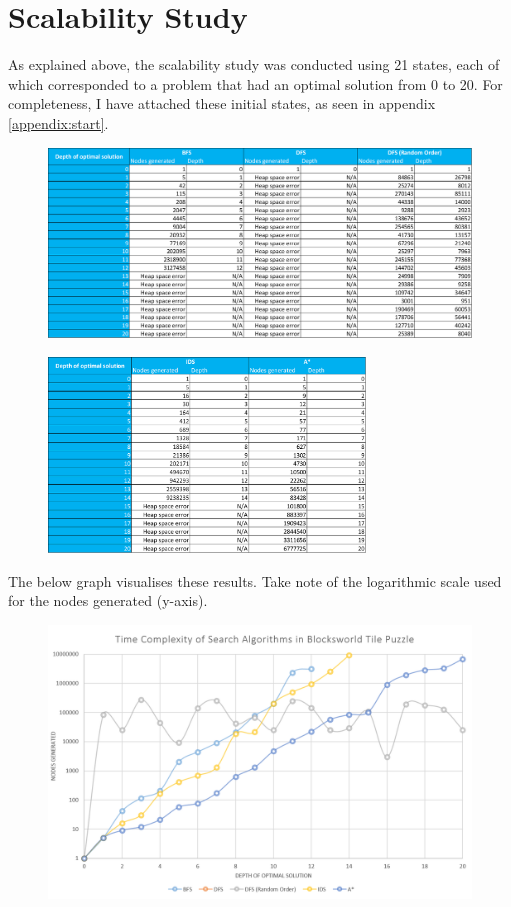\documentclass{article}
\begin{document}
	\newpage
	\section{Scalability Study}
	As explained above, the scalability study was conducted using 21 states, each of which corresponded to a problem that had an optimal solution from 0 to 20. For completeness, I have attached these initial states, as seen in appendix \ref{appendix:start}.
	\begin{figure}[h]	
		\centering
		\includegraphics[width=\textwidth,keepaspectratio]{Results-1.png}
	\end{figure}
	\begin{figure}[h]	
		\centering
		\includegraphics[width=0.75\textwidth,keepaspectratio]{Results-2.png}
	\end{figure}

	\newpage
	The below graph visualises these results. Take note of the logarithmic scale used for the nodes generated (y-axis).
	\begin{figure}[h]	
		\centering
		\includegraphics[height=0.5\textheight,keepaspectratio]{Results-Plot.png}
	\end{figure}
\end{document}
